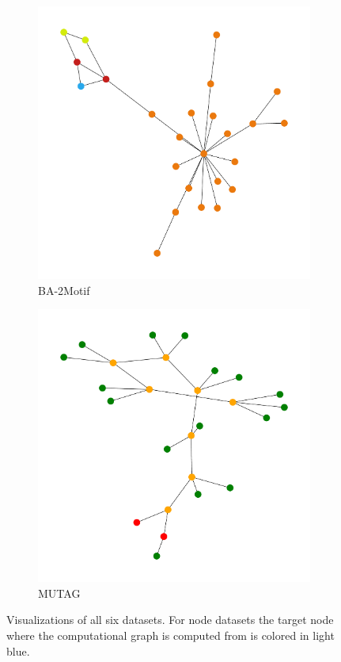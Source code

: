 \begin{figure}[H]
    \vspace{0.5cm}
    
    \begin{subfigure}[b]{0.4\textwidth}
        \includegraphics[width=\textwidth]{img/BA-2Motif-VIS-UNLABELED.pdf}
        \caption{BA-2Motif}
    \end{subfigure}
    \hfill
    \begin{subfigure}[b]{0.4\textwidth}
        \includegraphics[width=\textwidth]{img/MUTAG-VIS-LARGE-UNLABELED.pdf}
        \caption{MUTAG}
    \end{subfigure}

    \caption{Visualizations of all six datasets. For node datasets the target node where the computational graph is computed from is colored in light blue.}
\end{figure}